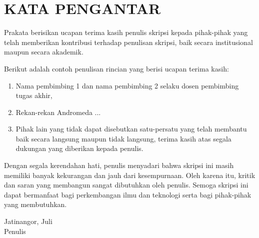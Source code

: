 \chapter*{\centering KATA PENGANTAR}

Prakata berisikan ucapan terima kasih penulis skripsi kepada pihak-pihak yang telah memberikan kontribusi terhadap penulisan skripsi, baik secara institusional maupun secara akademik.

Berikut adalah contoh penulisan rincian yang berisi ucapan terima kasih: 
\begin{enumerate}
	\item Nama pembimbing 1 dan nama pembimbing 2 selaku dosen pembimbing tugas akhir,
	\item Rekan-rekan Andromeda ...
	\item Pihak lain yang tidak dapat disebutkan satu-persatu yang telah membantu baik secara langsung maupun tidak langsung, terima kasih atas segala dukungan yang diberikan kepada penulis.
\end{enumerate}

Dengan segala kerendahan hati, penulis menyadari bahwa skripsi ini masih memiliki banyak kekurangan dan jauh dari kesempurnaan. Oleh karena itu, kritik dan saran yang membangun sangat dibutuhkan oleh penulis. Semoga skripsi ini dapat bermanfaat bagi perkembangan ilmu dan teknologi serta bagi pihak-pihak yang membutuhkan.

\vspace{1cm}
\begin{flushright}
	Jatinangor, Juli \the\year{}\\
	\vspace{0.5cm}
	Penulis
\end{flushright}
